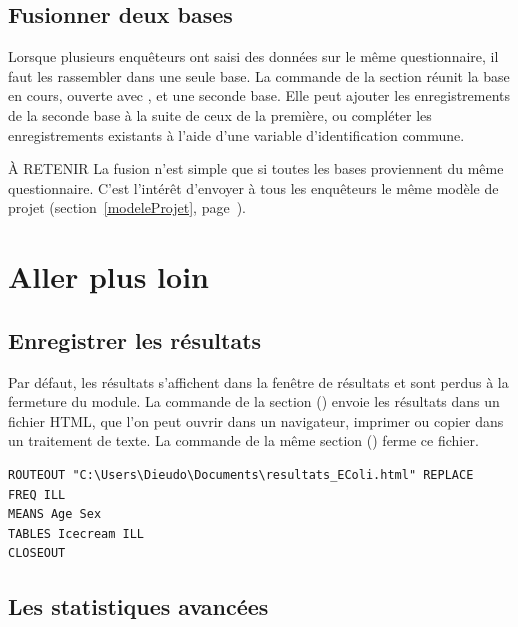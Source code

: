 \subsection{Fusionner deux bases}

Lorsque plusieurs enquêteurs ont saisi des données sur le même questionnaire, il faut les rassembler dans une seule base. La commande  de la section  réunit la base en cours, ouverte avec , et une seconde base. Elle peut ajouter les enregistrements de la seconde base à la suite de ceux de la première, ou compléter les enregistrements existants à l'aide d'une variable d'identification commune.

\begin{mybox}[colbacktitle=NOTE]{\faInfoCircle{} À RETENIR}
La fusion n'est simple que si toutes les bases proviennent du même questionnaire. C'est l'intérêt d'envoyer à tous les enquêteurs le même modèle de projet (section~\ref{modeleProjet}, page~\pageref{modeleProjet}).
\end{mybox}

\section{Aller plus loin}

\subsection{Enregistrer les résultats}

Par défaut, les résultats s'affichent dans la fenêtre de résultats et sont perdus à la fermeture du module. La commande  de la section  () envoie les résultats dans un fichier HTML, que l'on peut ouvrir dans un navigateur, imprimer ou copier dans un traitement de texte. La commande  de la même section () ferme ce fichier.

\begin{tcolorbox}
	\begin{lstlisting}[language=EPIscript, style=mystyle, caption={Enregistrer les résultats dans un fichier}, label=lst:routeout]
ROUTEOUT "C:\Users\Dieudo\Documents\resultats_EColi.html" REPLACE
FREQ ILL
MEANS Age Sex
TABLES Icecream ILL
CLOSEOUT
	\end{lstlisting}
\end{tcolorbox}

\subsection{Les statistiques avancées}

